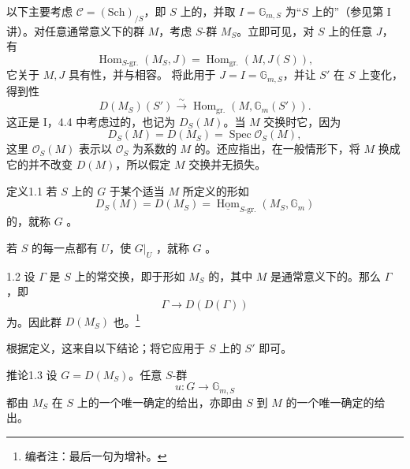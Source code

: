 以下主要考虑 $\mathcal C=(\mathrm{Sch})_{/S}$，即 $S$ 上的，并取 $I=\mathbb G_{m,S}$ 为“$S$ 上的”（参见第 I 讲）。对任意通常意义下的群 $M$，考虑 $S$-群 $M_S$。立即可见，对 $S$ 上的任意 $J$，有
\[
\operatorname{Hom}_{S\text{-}\mathrm{gr.}}(M_S,J)=\operatorname{Hom}_{\mathrm{gr.}}(M,J(S)),
\]
它关于 $M,J$ 具有性，并与相容。
将此用于 $J=I=\mathbb G_{m,S}$，并让 $S'$ 在 $S$ 上变化，得到性
\[
D(M_S)(S')\xrightarrow{\sim}\operatorname{Hom}_{\mathrm{gr.}}(M,\mathbb G_m(S')).\tag{1.0.4}
\]
这正是 I，4.4 中考虑过的，也记为 $D_S(M)$。当 $M$ 交换时它，因为
\[
D_S(M)=D(M_S)=\operatorname{Spec}\mathcal O_S(M),
\]
这里 $\mathcal O_S(M)$ 表示以 $\mathcal O_S$ 为系数的 $M$ 的。还应指出，在一般情形下，将 $M$ 换成它的并不改变 $D(M)$，所以假定 $M$ 交换并无损失。
\begin{SGAresult}{定义}{1.1}
若 $S$ 上的 $G$ 于某个适当 $M$ 所定义的形如
\[
D_S(M)=D(M_S)=\underline{\operatorname{Hom}}_{S\text{-}\mathrm{gr.}}(M_S,\mathbb G_m)
\]
的，就称 $G$ 。

若 $S$ 的每一点都有 $U$，使 $G|_U$ ，就称 $G$ 。
\end{SGAresult}
\begin{SGAresult}{}{1.2}
设 $\Gamma$ 是 $S$ 上的常交换，即于形如 $M_S$ 的，其中 $M$ 是通常意义下的。那么 $\Gamma$ ，即
\[
\Gamma\longrightarrow D(D(\Gamma))
\]
为。因此群 $D(M_S)$ 也。\footnote[3]{编者注：最后一句为增补。}
\end{SGAresult}
根据定义，这来自以下结论；将它应用于 $S$ 上的 $S'$ 即可。
\begin{SGAresult}{推论}{1.3}
设 $G=D(M_S)$。任意 $S$-群
\[
u:G\longrightarrow\mathbb G_{m,S}
\]
都由 $M_S$ 在 $S$ 上的一个唯一确定的给出，亦即由 $S$ 到 $M$ 的一个唯一确定的给出。
\end{SGAresult}
